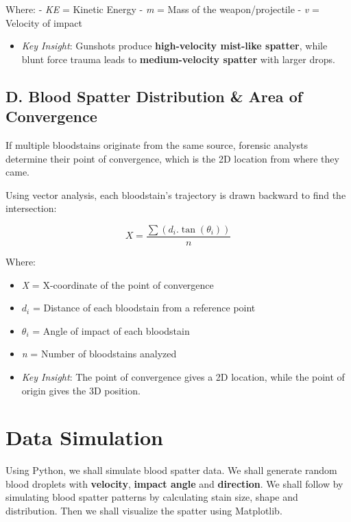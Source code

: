 \documentclass[11pt]{article}
\providecommand{\tightlist}{%
      \setlength{\itemsep}{0pt}\setlength{\parskip}{0pt}}
\begin{document}
Where: - \emph{KE} = Kinetic Energy - \emph{m} = Mass of the
weapon/projectile - \emph{v} = Velocity of impact

\begin{itemize}
\tightlist
\item
  \emph{Key Insight}: Gunshots produce \textbf{high-velocity mist-like
  spatter}, while blunt force trauma leads to \textbf{medium-velocity
  spatter} with larger drops.
\end{itemize}

\subsection{D. Blood Spatter Distribution \& Area of
Convergence}\label{d.-blood-spatter-distribution-area-of-convergence}

If multiple bloodstains originate from the same source, forensic
analysts determine their point of convergence, which is the 2D location
from where they came.

Using vector analysis, each bloodstain's trajectory is drawn backward to
find the intersection:

\[X=\frac{\sum(d_i .\tan(\theta_i))}{n}\]

Where:

\begin{itemize}
\item
  \emph{X} = X-coordinate of the point of convergence
\item
  \emph{\(d_i\)} = Distance of each bloodstain from a reference point
\item
  \emph{\(θ_i\)} = Angle of impact of each bloodstain
\item
  \emph{n} = Number of bloodstains analyzed
\item
  \emph{Key Insight}: The point of convergence gives a 2D location,
  while the point of origin gives the 3D position.
\end{itemize}

    \section{Data Simulation}\label{data-simulation}

Using Python, we shall simulate blood spatter data. We shall generate
random blood droplets with \textbf{velocity}, \textbf{impact angle} and
\textbf{direction}. We shall follow by simulating blood spatter patterns
by calculating stain size, shape and distribution. Then we shall
visualize the spatter using Matplotlib.
\end{document}
